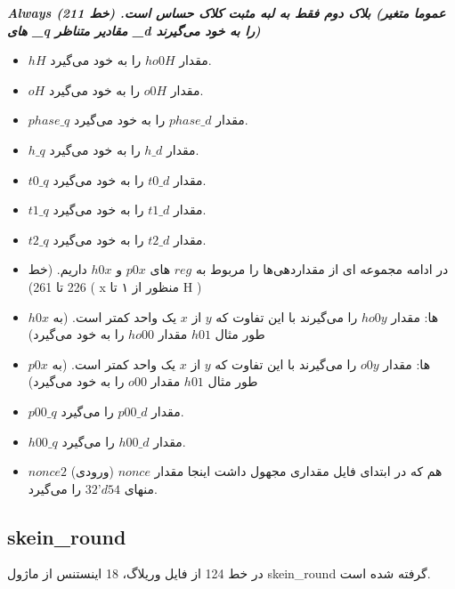 \textit{\textbf{Always بلاک دوم فقط به لبه مثبت کلاک حساس است. (خط 211)
	(عموما متغیر های \_q مقادیر متناظر \_d را به خود می‌گیرند) }}
\begin{itemize}
	\item
	      $hH$ مقدار $ho0H$ را به خود می‌گیرد.
	\item
	      $oH$ مقدار $o0H$ را به خود می‌گیرد.
	\item
	      $phase\_q$ مقدار $phase\_d$ را به خود می‌گیرد.
	\item
	      $h\_q$ مقدار $h\_d$ را به خود می‌گیرد.
	\item
	      $t0\_q$ مقدار $t0\_d$ را به خود می‌گیرد.
	\item
	      $t1\_q$ مقدار $t1\_d$ را به خود می‌گیرد.
	\item
	      $t2\_q$ مقدار $t2\_d$ را به خود می‌گیرد.
	\item
	      در ادامه مجموعه ای از مقداردهی‌ها را مربوط به $reg$ های
	       $p0x$
	      و 
	      $h0x$ 
	داریم. (خط 226 تا 261)
	( x منظور از ۱ تا H )
	\item
	      $h0x$ ها: مقدار $ho0y$ را می‌گیرند با این تفاوت که $y$ از $x$ یک واحد کمتر است. (به طور مثال $h01$ مقدار $ho00$ را به خود می‌گیرد)
	\item
	      $p0x$  ها: مقدار $o0y$ را می‌گیرند با این تفاوت که $y$ از $x$ یک واحد کمتر است. (به طور مثال $h01$ مقدار $o00$ را به خود می‌گیرد)
	\item
	      $p00\_q$ مقدار $p00\_d$ را می‌گیرد.
	\item
	      $h00\_q$ مقدار $h00\_d$ را می‌گیرد.
	\item
	      $nonce2$ هم که در ابتدای فایل مقداری مجهول داشت اینجا مقدار $nonce$ (ورودی)  منهای 
	      $32’d54$
	       را می‌گیرد.
\end{itemize}


\subsection{skein\_round}
در خط 124 از فایل وریلاگ، 18 اینستنس از ماژول skein\_round گرفته شده است.
